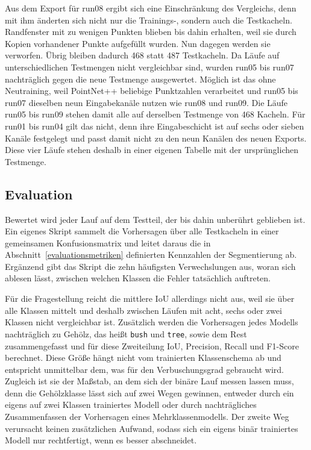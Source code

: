 Aus dem Export für run08 ergibt sich eine Einschränkung des Vergleichs, denn
mit ihm änderten sich nicht nur die Trainings-, sondern auch die Testkacheln.
Randfenster mit zu wenigen Punkten blieben bis dahin erhalten, weil sie durch
Kopien vorhandener Punkte aufgefüllt wurden. Nun dagegen werden sie verworfen. Übrig bleiben
dadurch 468 statt 487 Testkacheln. Da Läufe auf unterschiedlichen
Testmengen nicht vergleichbar sind, wurden run05 bis run07 nachträglich gegen
die neue Testmenge ausgewertet. Möglich ist das ohne Neutraining, weil
PointNet++ beliebige Punktzahlen verarbeitet und run05 bis run07 dieselben neun
Eingabekanäle nutzen wie run08 und run09. Die Läufe run05 bis run09 stehen damit
alle auf derselben Testmenge von 468 Kacheln. Für run01 bis run04 gilt das
nicht, denn ihre Eingabeschicht ist auf sechs oder sieben Kanäle festgelegt und
passt damit nicht zu den neun Kanälen des neuen Exports. Diese vier Läufe stehen
deshalb in einer eigenen Tabelle mit der ursprünglichen Testmenge.

\subsection{Evaluation}\label{evaluation}

Bewertet wird jeder Lauf auf dem Testteil, der bis dahin unberührt geblieben
ist. Ein eigenes Skript sammelt die Vorhersagen über alle Testkacheln in einer
gemeinsamen Konfusionsmatrix und leitet daraus die in
Abschnitt~\ref{evaluationsmetriken} definierten Kennzahlen der Segmentierung ab.
Ergänzend gibt das Skript die zehn häufigsten Verwechslungen aus, woran sich
ablesen lässt, zwischen welchen Klassen die Fehler tatsächlich auftreten.

Für die Fragestellung reicht die mittlere IoU allerdings nicht aus, weil sie
über alle Klassen mittelt und deshalb zwischen Läufen mit acht, sechs oder zwei
Klassen nicht vergleichbar ist. Zusätzlich werden die Vorhersagen jedes Modells
nachträglich zu Gehölz, das heißt \texttt{bush} und \texttt{tree}, sowie dem Rest
zusammengefasst und für diese Zweiteilung IoU, Precision, Recall und F1-Score
berechnet. Diese Größe hängt nicht vom trainierten Klassenschema ab und
entspricht unmittelbar dem, was für den Verbuschungsgrad gebraucht wird.
Zugleich ist sie der Maßstab, an dem sich der binäre Lauf messen lassen muss,
denn die Gehölzklasse lässt sich auf zwei Wegen gewinnen, entweder durch ein
eigens auf zwei Klassen trainiertes Modell oder durch nachträgliches
Zusammenfassen der Vorhersagen eines Mehrklassenmodells. Der zweite Weg
verursacht keinen zusätzlichen Aufwand, sodass sich ein eigens binär
trainiertes Modell nur rechtfertigt, wenn es besser abschneidet.

